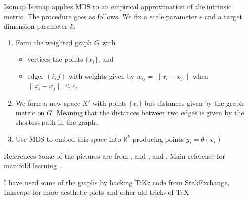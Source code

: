 \documentclass{beamer}
\begin{document}
\begin{frame}{Isomap}
	Isomap applies MDS to an empirical approximation of the intrinsic metric.
	The procedure goes as follows. We fix a scale parameter $\varepsilon$ and a target dimension parameter $k$.
	
	\begin{enumerate}
		\item Form the weighted graph $G$ with
		\begin{itemize}
			\item vertices the points $\{x_i\}$, and
			\item edges $(i,j)$ with weights given by $w_{ij}=\| x_i -x_j\|$ when $\|x_i -x_j\| \le \varepsilon$.
		\end{itemize}
		\item We form a new space $X'$ with points $\{x_i\}$ but distances given by the graph metric on $G$.  Meaning that the distances between two edges is given by the shortest path in the graph.
		\item Use MDS to embed this space into $\mathbb{R}^k$ producing points $y_i = \theta(x_i)$
	\end{enumerate}
\end{frame}


\begin{frame}{References}
	Some of the pictures are from \citep{docarmoriemann}, and \citep{schutz}, and \citep{geron2}. Main reference for manifold learning \citep{rabadan}.
	\printbibliography 	
	
	I have used some of the graphs by hacking TiKz code from StakExchange, Inkscape for more aesthetic plots and other old tricks of \TeX
	
\end{frame}


	
\end{document}
